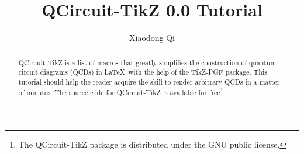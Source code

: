 \documentclass[twocolumn,nofootinbib,aps,,pra]{revtex4-1}
\begin{document}
\lstset{language=TeX}

\title{QCircuit-TikZ 0.0 Tutorial}

\author{Xiaodong Qi}
	
\begin{abstract}QCircuit-TikZ is a list of macros that greatly simplifies the construction of 
quantum circuit diagrams (QCDs) in \LaTeX \ with the help of the TikZ-PGF package.  
This tutorial should help the reader acquire 
the skill to render arbitrary QCDs in a matter of minutes. The source code for QCircuit-TikZ is available for free\footnote{The QCircuit-TikZ package is distributed under the GNU public license.}.
\end{abstract}

\maketitle
\end{document}
